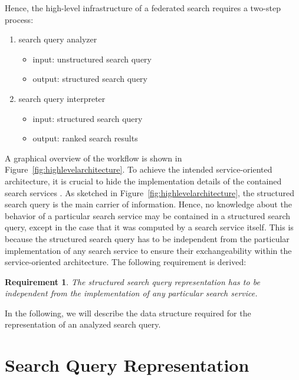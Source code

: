 \documentclass{acm_proc_article-sp}
\newtheorem{req}{Requirement}
\begin{document}
Hence, the high-level infrastructure of a federated search requires a two-step process:
\begin{enumerate}
\item search query analyzer
    \begin{itemize}
    \item input: unstructured search query
    \item output: structured search query
    \end{itemize}
\item search query interpreter
    \begin{itemize}
    \item input: structured search query
    \item output: ranked search results 
    \end{itemize}
\end{enumerate}
A graphical overview of the workflow is shown in Figure~\ref{fig:highlevelarchitecture}. 
To achieve the intended service-oriented architecture, it is crucial to hide the implementation details of the contained search services \cite{erl2008soa}.
As sketched in Figure~\ref{fig:highlevelarchitecture}, the structured search query is the main carrier of information.
Hence, no knowledge about the behavior of a particular search service may be contained in a structured search query, except in the case that it was computed by a search service itself. 
This is because the structured search query has to be independent from the particular implementation of any search service to ensure their exchangeability within the service-oriented architecture.
The following requirement is derived:
\begin{req}\label{req:independence}
The structured search query representation has to be independent from the implementation of any particular search service.
\end{req}

In the following, we will describe the data structure required for the representation of an analyzed search query.


\section{Search Query Representation}\label{sec:searchqueryanalysis}
\end{document}
